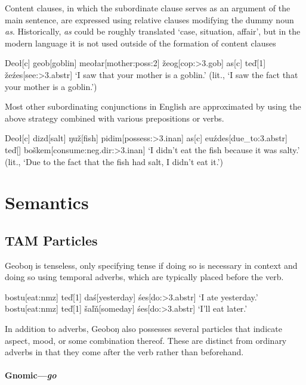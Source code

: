 \documentclass[a4paper,11pt,oneside,openany]{memoir}
\newcommand{\vd}{ď}
\newcommand{\vz}{ž}
\newcommand{\vs}{š}
\newcommand{\vl}{ľ}
\newcommand{\vn}{ň}
\newcommand{\engma}{ŋ}
\begin{document}
Content clauses, in which the subordinate clause serves as an argument of the main sentence, are expressed using relative clauses modifying the dummy noun \textit{as}. Historically, \textit{as} could be roughly translated `case, situation, affair', but in the modern language it is not used outside of the formation of content clauses

\ex
\begingl
Deo{\l}[{\sc c}] 
geob[goblin]
meo\l ar[mother:{\sc poss:2}]
\vz eog[\sc cop:>3.gob]
\nogloss{,}
as[{\sc c}]
te{\vd}[1]
\vz e\'zes[see:{\sc >3.abstr}]
\glft `I saw that your mother is a goblin.' (lit., `I saw the fact that your mother is a goblin.')
\endgl
\xe

Most other subordinating conjunctions in English are approximated by using the above strategy combined with various prepositions or verbs.

\ex 
\begingl
Deo\l[\sc c]
dizd[salt]
\engma u\vz[fish]
pidim[possess:{\sc >3.inan}]
\nogloss{,}
as[\sc c]
euźdes[due\_to:{\sc 3.abstr}]
te\vd[] 
bo\vs kem[consume:{\sc neg.dir:>3.inan}]
\glft `I didn't eat the fish because it was salty.' (lit., `Due to the fact that the fish had salt, I didn't eat it.')
\endgl
\xe 

\chapter{Semantics}

\section{TAM Particles}

Geobo{\engma} is tenseless, only specifying tense if doing so is necessary in context and doing so using temporal adverbs, which are typically placed before the verb.

\pex 
\a 
\begingl 
bostu[eat:{\sc nmz}]
te\vd[1]
da\'s[yesterday]
\'ses[do:{\sc >3.abstr}]
\glft `I ate yesterday.'
\endgl
\a 
\begingl 
bostu[eat:{\sc nmz}]
te\vd[1]
\vs a\vl\vn[someday]
\'ses[do:{\sc >3.abstr}]
\glft `I'll eat later.'
\endgl 
\xe

In addition to adverbs, Geobo{\engma} also possesses several particles that indicate aspect, mood, or some combination thereof. These are distinct from ordinary adverbs in that they come after the verb rather than beforehand.

\subsubsection{Gnomic---\textit{go}}
\end{document}
